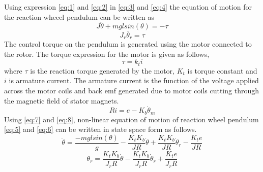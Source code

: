 \documentclass[a4paper]{article}
\begin{document}
Using expression \ref{eq:1} and \ref{eq:2} in \ref{eq:3} and \ref{eq:4} the equation of motion for the reaction wheeel pendulum can be written  as
\begin{equation}
J\ddot{\theta}+mglsin(\theta) = -\tau
\label{eq:5}
\end{equation}
\begin{equation}
J_r\ddot{\theta_r} = \tau
\label{eq:6}
\end{equation}
The control torque on the pendulum is generated using the motor connected to the rotor. The torque expression for the motor is given as follows,
\begin{equation}
\tau = k_ti
\label{eq:7}
\end{equation}
where $\tau$ is the reaction torque generated by the motor, $K_t$ is torque constant and $i$ is armature current. The armature current is the function of the voltage applied across the motor coils and back emf generated due to motor coils cutting through the magnetic field of stator magnets.
\begin{equation}
Ri = e-K_b\dot \theta_m
\label{eq:8}
\end{equation}
Using \ref{eq:7} and \ref{eq:8}, non-linear equation of motion of reaction wheel pendulum \ref{eq:5} and \ref{eq:6} can be written in state space form as follows.
\begin{equation}
\ddot{\theta} = \frac{-mglsin(\theta)}{g}-\frac{K_tK_b}{JR}\dot \theta + \frac{K_tK_b}{JR}\dot \theta_r-\frac{K_te}{JR}
\label{eq:9}
\end{equation}
\begin{equation}
\ddot{\theta_r} = \frac{K_tK_b}{J_rR}\dot \theta - \frac{K_tK_b}{J_rR}\dot \theta_r + \frac{K_te}{J_rR}
\label{eq:10}
\end{equation}
\end{document}
